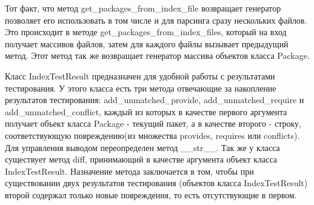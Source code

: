Тот факт, что метод get_packages_from_index_file возвращает генератор позволяет
его использовать в том числе и для парсинга сразу нескольких файлов. Это происходит
в методе get_packages_from_index_files, который на вход получает массивов файлов, 
затем для каждого файлы вызывает предыдущий метод. Этот метод так же возвращает
генератор массива объектов класса Package.

Класс IndexTestResult предназначен для удобной работы с результатами тестирования. 
У этого класса есть три метода отвечающие за накопление результатов тестирования:
add_unmatched_provide, add_unmatched_require и add_unmatched_conflict, каждый из которых
в качестве первого аргумента получает объект класса Package - текущий пакет, а в качестве второго
- строку, соответствующую повреждению(из множества provides, requires или conflicts).
Для управления выводом переопределен метод __str__. Так же у класса существует метод diff,
принимающий в качестве аргумента объект класса IndexTestResult. Назначение метода 
заключается в том, чтобы при существовании двух результатов тестирования (объектов
класса IndexTestResult) второй содержал только новые повреждения, то есть отсутствующие
в первом.

